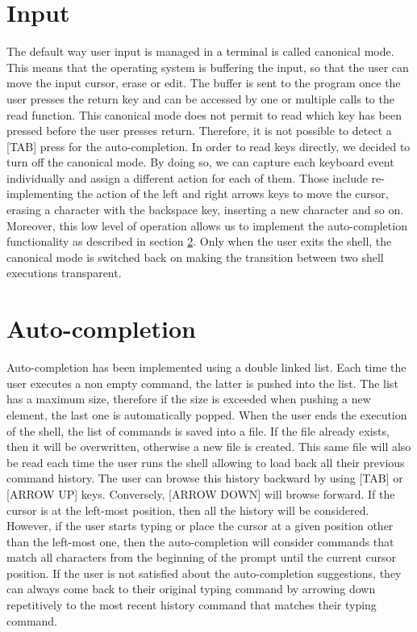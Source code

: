 \documentclass[fleqn]{article}
\begin{document}
\section{Input}

The default way user input is managed in a terminal is called canonical mode. This means that the operating system is buffering the input, so that the user can move the input cursor, erase or edit. The buffer is sent to the program once the user presses the return key and can be accessed by one or multiple calls to the read function. This canonical mode does not permit to read which key has been pressed before the user presses return. Therefore, it is not possible to detect a [TAB] press for the auto-completion. In order to read keys directly, we decided to turn off the canonical mode. By doing so, we can capture each keyboard event individually and assign a different action for each of them. Those include re-implementing the action of the left and right arrows keys to move the cursor, erasing a character with the backspace key, inserting a new character and so on. Moreover, this low level of operation allows us to implement the auto-completion functionality as described in section \ref{sec:auto}. Only when the user exits the shell, the canonical mode is switched back on making the transition between two shell executions transparent.



\section{Auto-completion}
\label{sec:auto}

Auto-completion has been implemented using a double linked list. Each time the user executes a non empty command, the latter is pushed into the list.
The list has a maximum size, therefore if the size is exceeded when pushing a new element, the last one is automatically popped.
When the user ends the execution of the shell, the list of commands is saved into a file. If the file already exists, then it will be overwritten, otherwise a new file is created.
This same file will also be read each time the user runs the shell allowing to load back all their previous command history.
The user can browse this history backward by using [TAB] or [ARROW UP] keys. Conversely, [ARROW DOWN] will browse forward.
If the cursor is at the left-most position, then all the history will be considered.
However, if the user starts typing or place the cursor at a given position other than the left-most one, then the auto-completion will consider commands that match all characters from the beginning of the prompt until the current cursor position.
If the user is not satisfied about the auto-completion suggestions, they can always come back to their original typing command by arrowing down repetitively to the most recent history command that matches their typing command.
\end{document}
